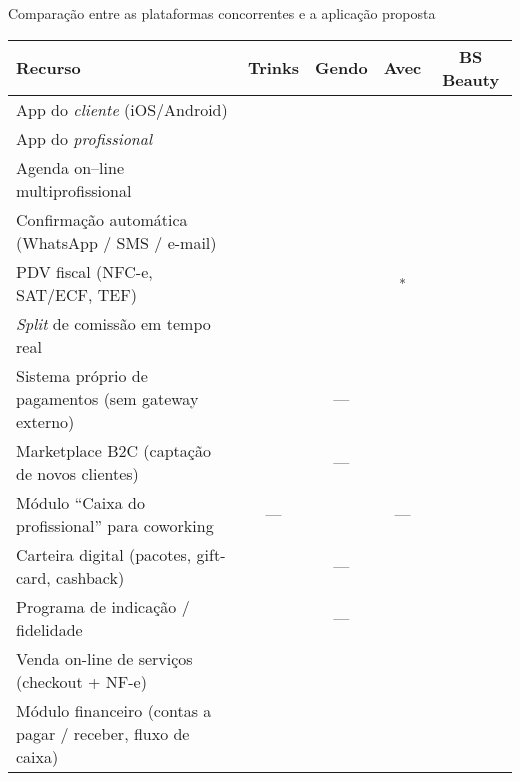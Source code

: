 \begin{quadro}[htb]
	\caption{\label{frame:comparativo_concorrência}Comparação entre as plataformas concorrentes e a aplicação proposta}
	\footnotesize
	\setlength{\tabcolsep}{4pt}
	\begin{tabular}{|p{6.8cm}|c|c|c|c|}
		\hline
		\textbf{Recurso}                                   & \textbf{Trinks} & \textbf{Gendo} & \textbf{Avec} & \textbf{BS Beauty}\\ \hline
		App do \textit{cliente} (iOS/Android)                               & \checkmark & \checkmark & \checkmark & \checkmark \\ \hline
		App do \textit{profissional}                                        & \checkmark & \checkmark & \checkmark & \checkmark \\ \hline
		Agenda on--line multiprofissional                                   & \checkmark & \checkmark & \checkmark & \checkmark \\ \hline
		Confirmação automática (WhatsApp / SMS / e-mail)                    & \checkmark & \checkmark & \checkmark & \checkmark \\ \hline
		PDV fiscal (NFC-e, SAT/ECF, TEF)                                    & \checkmark & \checkmark & \checkmark\textsuperscript{*} & \checkmark \\ \hline
		\emph{Split} de comissão em tempo real                              & \checkmark & \checkmark & \checkmark & \checkmark \\ \hline
		Sistema próprio de pagamentos (sem gateway externo)                 & \checkmark & — & \checkmark & \checkmark \\ \hline
		Marketplace B2C (captação de novos clientes)                        & \checkmark & — & \checkmark & \checkmark \\ \hline
		Módulo “Caixa do profissional” para coworking                       & — & \checkmark & — & \checkmark \\ \hline
		Carteira digital (pacotes, gift-card, cashback)                     & \checkmark & — & \checkmark & \checkmark \\ \hline
		Programa de indicação / fidelidade                                  & \checkmark & — & \checkmark & \checkmark \\ \hline
		Venda on-line de serviços (checkout + NF-e)                         & \checkmark & \checkmark & \checkmark & \checkmark \\ \hline
		Módulo financeiro (contas a pagar / receber, fluxo de caixa)        & \checkmark & \checkmark & \checkmark & \checkmark \\ \hline

\end{tabular}
\end{quadro}
